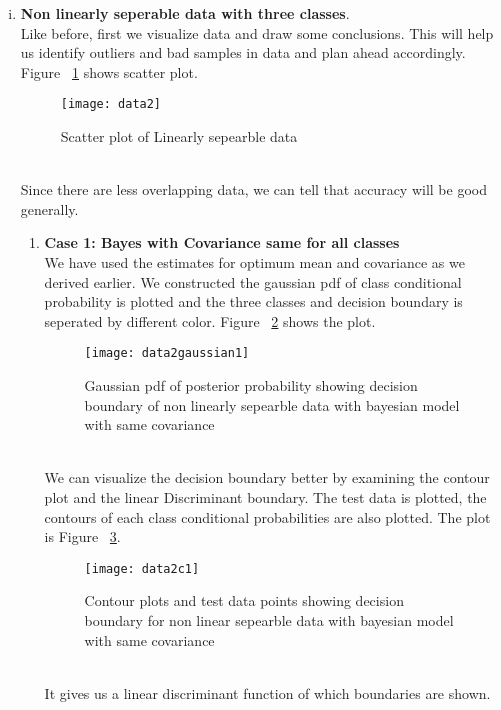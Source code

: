 \documentclass[11pt,paper=a4,answers]{exam}
\begin{document}
\begin{questions}
\begin{enumerate}[i.]
    \FloatBarrier
    \item \textbf{Non linearly seperable data with three classes}.\\
        Like before, first we visualize data and draw some conclusions. This will help us identify outliers and bad samples in data and plan ahead accordingly. Figure ~\ref{fig:scatterData2} shows scatter plot.\\
        \begin{figure}[ht]
            \centering
            \texttt{[image: data2]}
            \vspace{-30pt}
            \caption{Scatter plot of Linearly sepearble data}
            \label{fig:scatterData2}
        \end{figure}\\
        Since there are less overlapping data, we can tell that accuracy will be good generally.
        \begin{enumerate}
            \item \textbf{Case 1: Bayes with Covariance same for all classes}\\
            We have used the estimates for optimum mean and covariance as we derived earlier. We constructed the gaussian pdf of class conditional probability is plotted and the three classes and decision boundary is seperated by different color. Figure ~\ref{fig:data2g1} shows the plot.\\
            \begin{figure}[ht]
                \centering
                \texttt{[image: data2gaussian1]}
                \vspace{-30pt}
                \caption{Gaussian pdf of posterior probability showing decision boundary of non linearly sepearble data with bayesian model with same covariance}
                \label{fig:data2g1}
            \end{figure}\\
            We can visualize the decision boundary better by examining the contour plot and the linear Discriminant boundary. The test data is plotted, the contours of each class conditional probabilities are also plotted. The plot is Figure ~\ref{fig:data2c1}.\\ 
            \begin{figure}[ht]
                \centering
                \texttt{[image: data2c1]}
                \vspace{-30pt}
                \caption{Contour plots and test data points showing decision boundary for non linear sepearble data with bayesian model with same covariance}
                \label{fig:data2c1}
            \end{figure}\\
            It gives us a linear discriminant function of which boundaries are shown.\\
                        

\end{enumerate}
\end{enumerate}
\end{questions}
\end{document}
